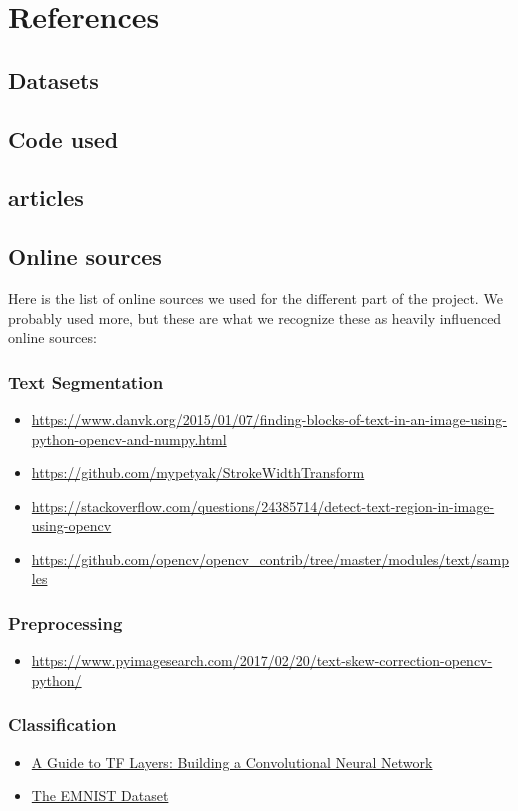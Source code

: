 \documentclass[Report.tex]{subfiles}
\begin{document}
\chapter{References}
\label{chap:References}
\section{Datasets}
\section{Code used}
\section{articles}
\section{Online sources}
Here is the list of online sources we used for the different part of the project. We probably used more, but these are what we recognize these as heavily influenced online sources:  

\subsection{Text Segmentation}
\begin{itemize}
    \item \url{https://www.danvk.org/2015/01/07/finding-blocks-of-text-in-an-image-using-python-opencv-and-numpy.html}
    \item \url{https://github.com/mypetyak/StrokeWidthTransform}
    \item \url{https://stackoverflow.com/questions/24385714/detect-text-region-in-image-using-opencv}
    \item \url{https://github.com/opencv/opencv_contrib/tree/master/modules/text/samples}
\end{itemize}
\subsection{Preprocessing}
\begin{itemize}
    \item \url{https://www.pyimagesearch.com/2017/02/20/text-skew-correction-opencv-python/}
\end{itemize}
\subsection{Classification}
\begin{itemize}
    \item \href{https://www.tensorflow.org/tutorials/layers}{A Guide to TF Layers: Building a Convolutional Neural Network}
    \item \href{https://www.nist.gov/itl/iad/image-group/emnist-dataset}{The EMNIST Dataset}
\end{itemize}
\end{document}
